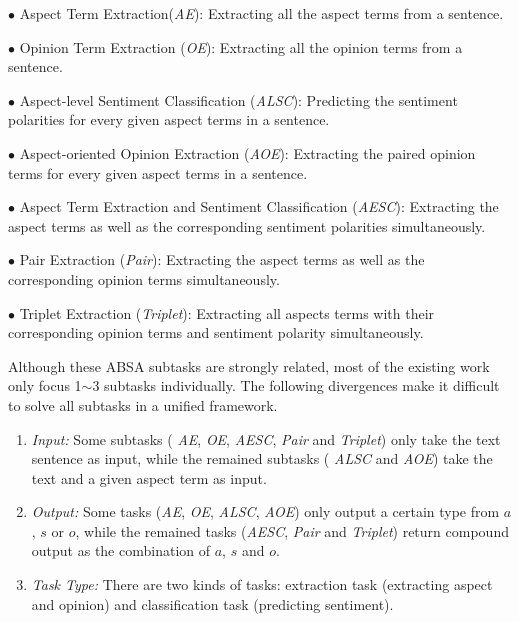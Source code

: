 \documentclass[11pt,a4paper]{article}
\begin{document}
$\bullet$ Aspect Term Extraction(\emph{AE}): Extracting all the aspect terms from a sentence.

$\bullet$ Opinion Term Extraction (\emph{OE}): Extracting all the opinion terms from a sentence.

$\bullet$ Aspect-level Sentiment Classification (\emph{ALSC}): Predicting the sentiment polarities for every given aspect terms in a sentence.

$\bullet$ Aspect-oriented Opinion Extraction (\emph{AOE}): Extracting the paired opinion terms for every given aspect terms in a sentence.

$\bullet$ Aspect Term Extraction and  Sentiment Classification (\emph{AESC}): Extracting the aspect terms as well as the corresponding sentiment polarities simultaneously.

$\bullet$ Pair Extraction (\emph{Pair}):  Extracting the aspect terms as well as the corresponding opinion terms simultaneously.

$\bullet$ Triplet Extraction (\emph{Triplet}): Extracting all aspects terms with their corresponding opinion terms and sentiment polarity simultaneously.





Although these ABSA subtasks are strongly related, most of the existing work only focus 1$\sim$3 subtasks individually. The following divergences make it difficult to solve all subtasks in a unified framework.
\begin{enumerate}
\setlength{\itemsep}{1pt}\setlength{\parskip}{1pt}\item \textit{Input:} Some subtasks (  \emph{AE}, \emph{OE},  \emph{AESC},  \emph{Pair}  and \emph{Triplet}) only take the text sentence as input, while the remained subtasks ( \emph{ALSC} and \emph{AOE}) take the text and a given aspect term as input.
\item \textit{Output:}  Some tasks (\emph{AE},  \emph{OE}, \emph{ALSC}, \emph{AOE}) only output a certain type from $a$, $s$ or $o$, while the remained tasks (\emph{AESC}, \emph{Pair} and \emph{Triplet}) return compound output as the combination of $a$, $s$ and $o$.
  \item \textit{Task Type:} There are two kinds of tasks: extraction task (extracting aspect and opinion) and classification task (predicting sentiment).
\end{enumerate}
\end{document}
